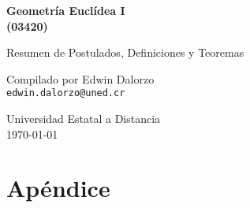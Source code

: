 \documentclass[12pt,titlepage]{article}
\theoremstyle{plain}
\theoremstyle{definition}
\theoremstyle{remark}
\begin{document}
\begin{titlepage}
   \begin{center}
       \vspace*{1cm}

       \Large \textbf{Geometría Euclídea I} \\ \small{\textbf{(03420)}}
       
       \vspace{2.5cm}
       
       \large{Resumen de Postulados, Definiciones y Teoremas}

       \vspace{2.5cm}

       Compilado por Edwin Dalorzo \\ \texttt{edwin.dalorzo@uned.cr}

       \vfill
            
       Universidad Estatal a Distancia \\ \today 
    \end{center}
\end{titlepage}

\clearpage
\tableofcontents








 

\clearpage
\appendix

\section{Apéndice}




%
\end{document}
